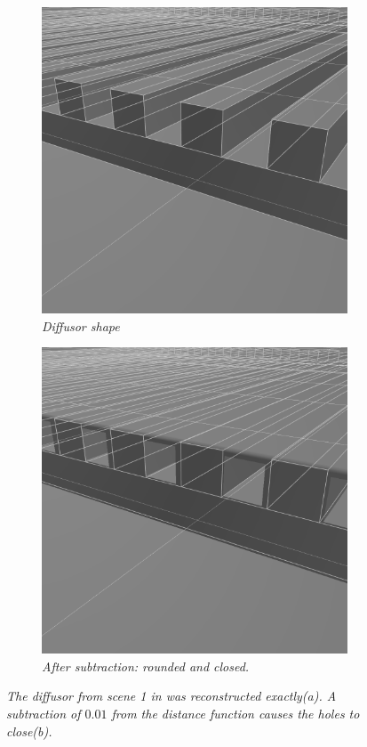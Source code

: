 \documentclass[twoside,a4paper]{article}
\begin{document}
\begin{figure}[ht]
\centering
\begin{subfigure}[t]{0.2\textwidth}
  \centering
  \includegraphics[width=0.9\linewidth]{img/diffusorNorm.png}
  \caption{\it Diffusor shape}
  \label{fig:diffNorm}
\end{subfigure}%
\begin{subfigure}[t]{0.2\textwidth}
  \centering
  \includegraphics[width=0.9\linewidth]{img/diffusorSmooth.png}
  \caption{\it After subtraction: rounded and closed.}
  \label{fig:sub2}
\end{subfigure}
\caption{\it The diffusor from scene 1 in \cite{brinkmann_round_2019} was reconstructed exactly(a). A subtraction of $0.01$ from the distance function causes the holes to close(b).}
\label{fig:diffSmooth}
\end{figure}
\end{document}
